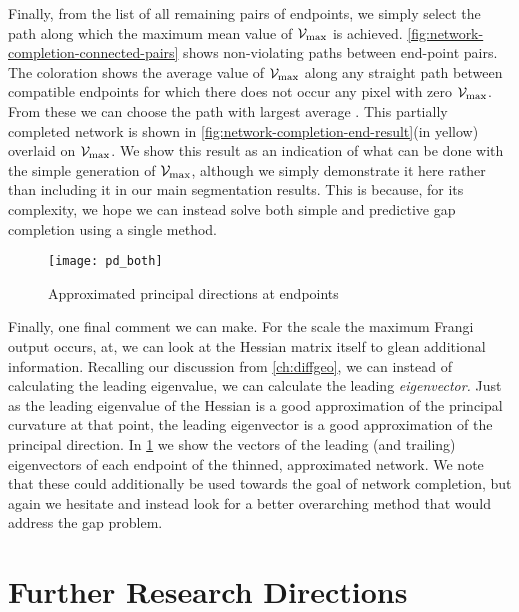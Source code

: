 Finally, from the list of all remaining pairs of endpoints, we simply select the path along which the maximum mean value of $\mathcal{V}_{\max}$ is achieved. \cref{fig:network-completion-connected-pairs} shows non-violating paths between end-point pairs. The coloration shows the average value of $\mathcal{V}_{\max}$ along any straight path between compatible endpoints for which there does not occur any pixel with zero $\mathcal{V}_{\max}$. From these we can choose the path with largest average \Vmax. This partially completed network is shown in  \cref{fig:network-completion-end-result}(in yellow) overlaid on $\mathcal{V}_{\max}$.
We show this result as an indication of what can be done with the simple generation of $\mathcal{V}_{\max}$, although we simply demonstrate it here rather than including it in our main segmentation results. This is because, for its complexity, we hope we can instead solve both simple and predictive gap completion using a single method.

\begin{figure}[t] \centering
	\texttt{[image: pd\_both]}
	\caption{Approximated principal directions at endpoints}
	\label{fig:pd_demo}
\end{figure}

Finally, one final comment we can make. For the scale the maximum Frangi output occurs, at, we can look at the Hessian matrix itself to glean additional information. Recalling our discussion from \cref{ch:diffgeo}, we can instead of calculating the leading eigenvalue, we can calculate the leading \textit{eigenvector.} Just as the leading eigenvalue of the Hessian is a good approximation of the principal curvature at that point, the leading eigenvector is a good approximation of the principal direction. In \cref{fig:pd_demo} we show the vectors of the leading (and trailing) eigenvectors of each endpoint of the thinned, approximated network. We note that these could additionally be used towards the goal of network completion, but again we hesitate and instead look for a better overarching method that would address the gap problem.


\section{Further Research Directions}

